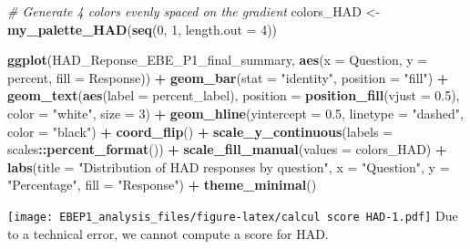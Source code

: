 \documentclass[
]{article}
\newenvironment{Shaded}{\begin{snugshade}}{\end{snugshade}}
\newcommand{\AttributeTok}[1]{\textcolor[rgb]{0.13,0.29,0.53}{#1}}
\newcommand{\CommentTok}[1]{\textcolor[rgb]{0.56,0.35,0.01}{\textit{#1}}}
\newcommand{\DecValTok}[1]{\textcolor[rgb]{0.00,0.00,0.81}{#1}}
\newcommand{\FloatTok}[1]{\textcolor[rgb]{0.00,0.00,0.81}{#1}}
\newcommand{\FunctionTok}[1]{\textcolor[rgb]{0.13,0.29,0.53}{\textbf{#1}}}
\newcommand{\NormalTok}[1]{#1}
\newcommand{\OtherTok}[1]{\textcolor[rgb]{0.56,0.35,0.01}{#1}}
\newcommand{\SpecialCharTok}[1]{\textcolor[rgb]{0.81,0.36,0.00}{\textbf{#1}}}
\newcommand{\StringTok}[1]{\textcolor[rgb]{0.31,0.60,0.02}{#1}}
\begin{document}
\begin{Shaded}
\begin{Highlighting}[]
\CommentTok{\# Generate 4 colors evenly spaced on the gradient}
\NormalTok{colors\_HAD }\OtherTok{\textless{}{-}} \FunctionTok{my\_palette\_HAD}\NormalTok{(}\FunctionTok{seq}\NormalTok{(}\DecValTok{0}\NormalTok{, }\DecValTok{1}\NormalTok{, }\AttributeTok{length.out =} \DecValTok{4}\NormalTok{))}


\FunctionTok{ggplot}\NormalTok{(HAD\_Reponse\_EBE\_P1\_final\_summary, }\FunctionTok{aes}\NormalTok{(}\AttributeTok{x =}\NormalTok{ Question, }\AttributeTok{y =}\NormalTok{ percent, }\AttributeTok{fill =}\NormalTok{ Response)) }\SpecialCharTok{+}
  \FunctionTok{geom\_bar}\NormalTok{(}\AttributeTok{stat =} \StringTok{"identity"}\NormalTok{, }\AttributeTok{position =} \StringTok{"fill"}\NormalTok{) }\SpecialCharTok{+}
  \FunctionTok{geom\_text}\NormalTok{(}\FunctionTok{aes}\NormalTok{(}\AttributeTok{label =}\NormalTok{ percent\_label),}
            \AttributeTok{position =} \FunctionTok{position\_fill}\NormalTok{(}\AttributeTok{vjust =} \FloatTok{0.5}\NormalTok{),}
            \AttributeTok{color =} \StringTok{"white"}\NormalTok{,}
            \AttributeTok{size =} \DecValTok{3}\NormalTok{) }\SpecialCharTok{+}
  \FunctionTok{geom\_hline}\NormalTok{(}\AttributeTok{yintercept =} \FloatTok{0.5}\NormalTok{, }\AttributeTok{linetype =} \StringTok{"dashed"}\NormalTok{, }\AttributeTok{color =} \StringTok{"black"}\NormalTok{) }\SpecialCharTok{+}
  \FunctionTok{coord\_flip}\NormalTok{() }\SpecialCharTok{+}
  \FunctionTok{scale\_y\_continuous}\NormalTok{(}\AttributeTok{labels =}\NormalTok{ scales}\SpecialCharTok{::}\FunctionTok{percent\_format}\NormalTok{()) }\SpecialCharTok{+}
  \FunctionTok{scale\_fill\_manual}\NormalTok{(}\AttributeTok{values =}\NormalTok{ colors\_HAD) }\SpecialCharTok{+}
  \FunctionTok{labs}\NormalTok{(}\AttributeTok{title =} \StringTok{"Distribution of HAD responses by question"}\NormalTok{,}
       \AttributeTok{x =} \StringTok{"Question"}\NormalTok{,}
       \AttributeTok{y =} \StringTok{"Percentage"}\NormalTok{,}
       \AttributeTok{fill =} \StringTok{"Response"}\NormalTok{) }\SpecialCharTok{+}
  \FunctionTok{theme\_minimal}\NormalTok{() }
\end{Highlighting}
\end{Shaded}

\texttt{[image: EBEP1\_analysis\_files/figure-latex/calcul score HAD-1.pdf]}
Due to a technical error, we cannot compute a score for HAD.
\end{document}

